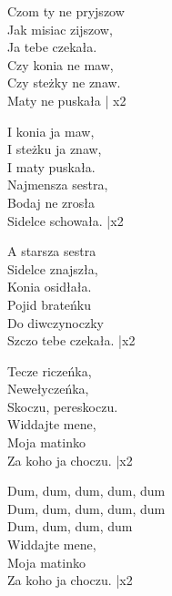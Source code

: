 \begin{text}
    Czom ty ne pryjszow\\
    Jak misiac zijszow,\\
    Ja tebe czekała.\\
    \vin Czy konia ne maw,\\
    \vin Czy steżky ne znaw.\\
    \vin Maty ne puskała | x2

    I konia ja maw,\\
    I steżku ja znaw,\\
    I maty puskała.\\
    \vin Najmensza sestra,\\
    \vin Bodaj ne zrosła\\
    \vin Sidelce schowała. |x2

    A starsza sestra\\
    Sidelce znajszła,\\
    Konia osidłała.\\
    \vin Pojid brateńku\\
    \vin Do diwczynoczky\\
    \vin Szczo tebe czekała. |x2

    Tecze riczeńka,\\
    Newełyczeńka,\\
    Skoczu, pereskoczu.\\
    \vin Widdajte mene,\\
    \vin Moja matinko\\
    \vin Za koho ja choczu. |x2

    Dum, dum, dum, dum, dum\\
    Dum, dum, dum, dum, dum\\
    Dum, dum, dum, dum\\
    \vin Widdajte mene,\\
    \vin Moja matinko\\
    \vin Za koho ja choczu. |x2
\end{text}
